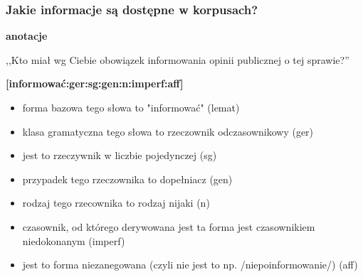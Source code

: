 \documentclass{beamer}
\begin{document}
\begin{frame}
  \frametitle{Jakie informacje są dostępne w korpusach?}
  \vspace{0.5em}
  {\Large \textbf{anotacje}}
  \vspace{0.5em}

  ,,Kto miał wg Ciebie obowiązek informowania opinii publicznej o tej sprawie?''

  \vspace{0.5em}

\textbf{[informować:ger:sg:gen:n:imperf:aff]}
  \begin{itemize}
  \item forma bazowa tego słowa to "informować" (lemat)
  \item klasa gramatyczna tego słowa to rzeczownik odczasownikowy (ger)
  \item jest to rzeczywnik w liczbie pojedynczej (sg)
  \item przypadek tego rzeczownika to dopełniacz (gen)
  \item rodzaj tego rzecownika to rodzaj nijaki (n)
  \item czasownik, od którego derywowana jest ta forma jest czasownikiem niedokonanym (imperf)
  \item jest to forma niezanegowana (czyli nie jest to np. /niepoinformowanie/) (aff)
  \end{itemize}
\end{frame}



 
\end{document}
